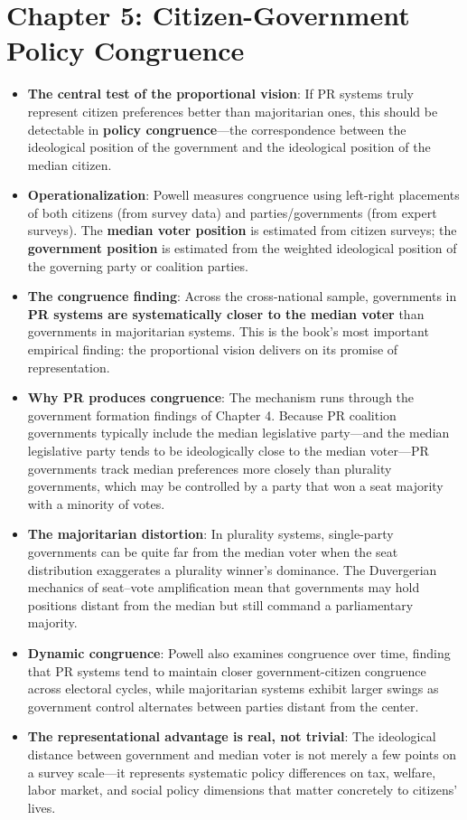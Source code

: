 \documentclass[12pt]{article}
\begin{document}
\section{Chapter 5: Citizen-Government Policy Congruence}

\begin{itemize}[leftmargin=*, itemsep=4pt]
    \item \textbf{The central test of the proportional vision}: If PR systems truly represent citizen preferences better than majoritarian ones, this should be detectable in \textbf{policy congruence}---the correspondence between the ideological position of the government and the ideological position of the median citizen.
    \item \textbf{Operationalization}: Powell measures congruence using left-right placements of both citizens (from survey data) and parties/governments (from expert surveys). The \textbf{median voter position} is estimated from citizen surveys; the \textbf{government position} is estimated from the weighted ideological position of the governing party or coalition parties.
    \item \textbf{The congruence finding}: Across the cross-national sample, governments in \textbf{PR systems are systematically closer to the median voter} than governments in majoritarian systems. This is the book's most important empirical finding: the proportional vision delivers on its promise of representation.
    \item \textbf{Why PR produces congruence}: The mechanism runs through the government formation findings of Chapter 4. Because PR coalition governments typically include the median legislative party---and the median legislative party tends to be ideologically close to the median voter---PR governments track median preferences more closely than plurality governments, which may be controlled by a party that won a seat majority with a minority of votes.
    \item \textbf{The majoritarian distortion}: In plurality systems, single-party governments can be quite far from the median voter when the seat distribution exaggerates a plurality winner's dominance. The Duvergerian mechanics of seat--vote amplification mean that governments may hold positions distant from the median but still command a parliamentary majority.
    \item \textbf{Dynamic congruence}: Powell also examines congruence over time, finding that PR systems tend to maintain closer government-citizen congruence across electoral cycles, while majoritarian systems exhibit larger swings as government control alternates between parties distant from the center.
    \item \textbf{The representational advantage is real, not trivial}: The ideological distance between government and median voter is not merely a few points on a survey scale---it represents systematic policy differences on tax, welfare, labor market, and social policy dimensions that matter concretely to citizens' lives.
\end{itemize}
\end{document}

